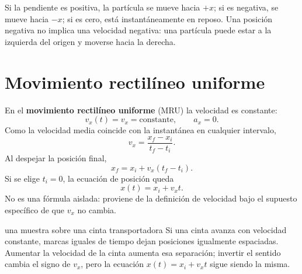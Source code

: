 \documentclass[11pt]{article}
\begin{document}
Si la pendiente es positiva, la partícula se mueve hacia \(+x\); si es
negativa, se mueve hacia \(-x\); si es cero, está instantáneamente en reposo.
Una posición negativa no implica una velocidad negativa: una partícula puede
estar a la izquierda del origen y moverse hacia la derecha.

\section{Movimiento rectilíneo uniforme}

En el \textbf{movimiento rectilíneo uniforme} (MRU) la velocidad es constante:
\[
  v_x(t)=v_x=\text{constante},
  \qquad
  a_x=0.
\]
Como la velocidad media coincide con la instantánea en cualquier intervalo,
\[
  v_x
  =
  \frac{x_f-x_i}{t_f-t_i}.
\]
Al despejar la posición final,
\[
  x_f=x_i+v_x(t_f-t_i).
\]
Si se elige \(t_i=0\), la ecuación de posición queda
\[
  \boxed{x(t)=x_i+v_xt}.
\]
No es una fórmula aislada: proviene de la definición de velocidad bajo el
supuesto específico de que \(v_x\) no cambia.

\begin{center}
\end{center}

\begin{ejemplocualitativo}{una muestra sobre una cinta transportadora}
Si una cinta avanza con velocidad constante, marcas iguales de tiempo dejan
posiciones igualmente espaciadas. Aumentar la velocidad de la cinta aumenta
esa separación; invertir el sentido cambia el signo de \(v_x\), pero la
ecuación \(x(t)=x_i+v_xt\) sigue siendo la misma.
\end{ejemplocualitativo}
\end{document}

